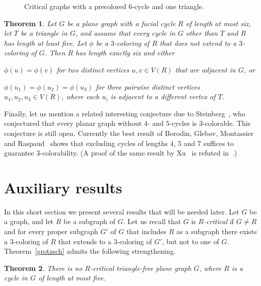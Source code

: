 \documentclass{article}
\def\mytextindent#1{\indent\indent\llap{\rm#1\enspace}\ignorespaces}
\def\myitem{\par\hangindent30pt\mytextindent}
\def\rt#1{#1}
\def\mylabel#1{{\label{#1}}}
\newtheorem{theorem}{Theorem}
\begin{document}
\begin{figure}
\begin{center}\end{center}
\caption{Critical graphs with a precolored $6$-cycle and one triangle.}
\label{fig-6plus3}
\end{figure}

\begin{theorem}
\mylabel{thm-6plus3}
Let $G$ be a plane graph with a facial cycle $R$ of length at most six,
let $T$ be a triangle in $G$, and assume that
every cycle in $G$ other than $T$ and $R$ has length at least five.
Let $\phi$ be a $3$-coloring of $R$ that does not extend to a $3$-coloring
of $G$. Then $R$ has length exactly six and either
\myitem{(a)}$\phi(u)=\phi(v)$ for two distinct vertices $u,v\in V(R)$ that are
adjacent in $G$, or
\myitem{(b)}$\phi(u_1)=\phi(u_2)=\phi(u_3)$ for three pairwise distinct
vertices $u_1,u_2,u_3\in V(R)$, where each $u_i$ is adjacent to a different
vertex of $T$.
\end{theorem}

Finally, let us mention a related interesting conjecture due to
Steinberg~\cite{conj-stein}, who conjectured that every planar graph 
without $4$- and $5$-cycles is $3$-colorable.
This conjecture is still open. 
Currently the best result of 
Borodin, Glebov, Montassier and Raspaud~\cite{BorGleMonRas}
shows that excluding cycles 
of lengths $4$, $5$ and $7$ suffices to guarantee $3$-colorability. 
(A proof of the same result by Xu~\cite{xu} is refuted in~\cite{BorGleMonRas}.)

\section{Auxiliary results}


In this short section we present several results that will be needed later.
Let $G$ be a graph, and let $R$ be a subgraph of $G$.
\rt{Let us recall} that $G$ is {\em $R$-critical} if $G\ne R$ and 
for every proper subgraph $G'$ of $G$ that includes $R$ as a subgraph
there exists a $3$-coloring of $R$ that extends to a $3$-coloring of $G'$,
but not to one of $G$.
Theorem~\ref{grotzsch} admits the following strengthening.

\begin{theorem}\label{grotzsch5cycle}
There is no $R$-critical triangle-free plane graph $G$, where 
$R$ is a cycle in $G$ of length at most five.
\end{theorem}
\end{document}
